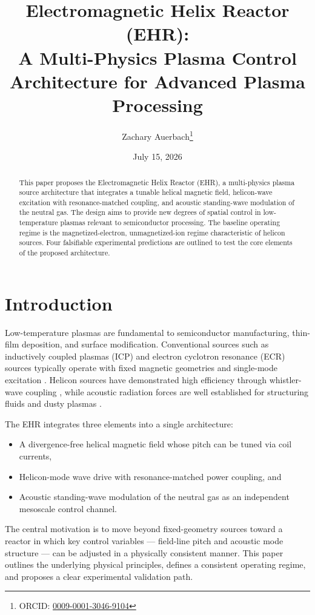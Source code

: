 \documentclass[11pt]{article}
\title{Electromagnetic Helix Reactor (EHR): \\ A Multi-Physics Plasma Control Architecture for Advanced Plasma Processing}
\author{Zachary Auerbach\thanks{ORCID: \href{https://orcid.org/0009-0001-3046-9104}{0009-0001-3046-9104}}}
\date{July 15, 2026}
\begin{document}
\maketitle

\begin{abstract}
This paper proposes the Electromagnetic Helix Reactor (EHR), a multi-physics plasma source architecture that integrates a tunable helical magnetic field, helicon-wave excitation with resonance-matched coupling, and acoustic standing-wave modulation of the neutral gas. The design aims to provide new degrees of spatial control in low-temperature plasmas relevant to semiconductor processing. The baseline operating regime is the magnetized-electron, unmagnetized-ion regime characteristic of helicon sources. Four falsifiable experimental predictions are outlined to test the core elements of the proposed architecture.
\end{abstract}

\section{Introduction}

Low-temperature plasmas are fundamental to semiconductor manufacturing, thin-film deposition, and surface modification. Conventional sources such as inductively coupled plasmas (ICP) and electron cyclotron resonance (ECR) sources typically operate with fixed magnetic geometries and single-mode excitation \cite{lieberman,chabert,oehrlein2018,asmussen1989}. Helicon sources have demonstrated high efficiency through whistler-wave coupling \cite{boswell1984,chen2015}, while acoustic radiation forces are well established for structuring fluids and dusty plasmas \cite{gorkov1962,bruus2012}.

The EHR integrates three elements into a single architecture:
\begin{itemize}
    \item A divergence-free helical magnetic field whose pitch can be tuned via coil currents,
    \item Helicon-mode wave drive with resonance-matched power coupling, and
    \item Acoustic standing-wave modulation of the neutral gas as an independent mesoscale control channel.
\end{itemize}

The central motivation is to move beyond fixed-geometry sources toward a reactor in which key control variables — field-line pitch and acoustic mode structure — can be adjusted in a physically consistent manner. This paper outlines the underlying physical principles, defines a consistent operating regime, and proposes a clear experimental validation path.
\end{document}
